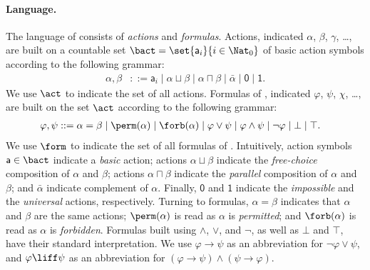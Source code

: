 \paragraph{Language.}\label{section:dal:syntax}

The language of {\DAL} consists of \emph{actions} and \emph{formulas}.
Actions, indicated $\alpha$, $\beta$, $\gamma$, \dots, are built on a countable set $\bact = \set{\mathsf{a}_i}{i\in \Nat_0}$ of basic action symbols according to the following grammar:
%
\begin{align}
		\alpha,\beta & ::=
				\mathsf{a}_i
			\mid
				{\alpha \sqcup \beta}
			\mid
				{\alpha \sqcap \beta}
			\mid
				{\bar{\alpha}}
			\mid
				\mathsf{0}
			\mid
				\mathsf{1}. \label{definition:actions}
\end{align}%
We use $\act$ to indicate the set of all actions.
Formulas of \DAL, indicated $\varphi$, $\psi$, $\chi$, \dots, are built on the set $\act$ according to the following grammar:
%
\begin{align}
		\varphi,\psi & ::=
				{\alpha = \beta} \mid
				\perm(\alpha)
				\mid
				\forb(\alpha)
			\mid
				{\varphi \lor \psi}
			\mid
				{\varphi \land \psi}
			\mid
				{\lnot \varphi}
			\mid
				\bot
			\mid
				\top.
			\label{definition:formulas}
\end{align}%
We use $\form$ to indicate the set of all formulas of \DAL.
Intuitively, action symbols $\mathsf{a} \in \bact$ indicate a \emph{basic} action; actions ${\alpha \sqcup \beta}$ indicate the \emph{free-choice} composition of $\alpha$ and $\beta$; actions ${\alpha \sqcap \beta}$ indicate the \emph{parallel} composition of $\alpha$ and $\beta$; and $\bar{\alpha}$ indicate complement of $\alpha$. Finally, $\mathsf{0}$ and $\mathsf{1}$ indicate the \emph{impossible} and the \emph{universal} actions, respectively.
%
Turning to formulas, $\alpha = \beta$ indicates that $\alpha$ and $\beta$ are the same actions;  $\perm(\alpha)$ is read as $\alpha$ is \emph{permitted};
and $\forb(\alpha)$ is read as $\alpha$ is \emph{forbidden}.
Formulas built using $\land$, $\lor$, and $\lnot$, as well as $\bot$ and $\top$, have their standard interpretation.
We use $\varphi \to \psi$ as an abbreviation for $\lnot \varphi \lor \psi$, and $\varphi \liff \psi$ as an abbreviation for $(\varphi \to \psi) \land (\psi \to \varphi)$.

